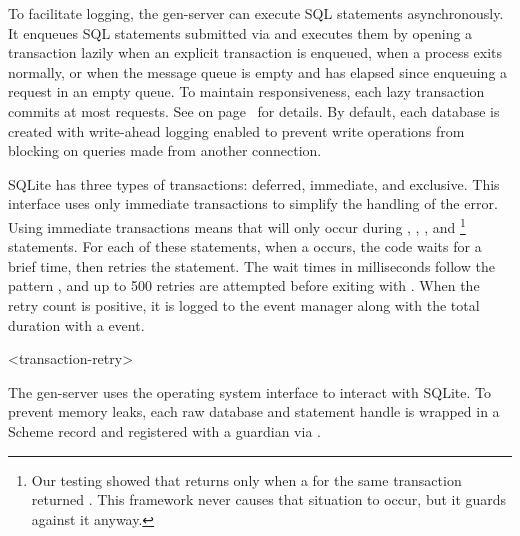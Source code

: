 To facilitate logging, the  gen-server can execute SQL statements
asynchronously. It enqueues SQL statements submitted via  and
executes them by opening a transaction lazily when an explicit transaction is
enqueued, when a  process exits normally, or when the 
message queue is empty and  has elapsed since enqueuing
a  request in an empty queue.
To maintain responsiveness, each lazy transaction commits at most   requests.
See  on page~\pageref{db:options} for details.
By default, each database is created with write-ahead logging enabled
to prevent write operations from blocking on queries made from another
connection.

SQLite has three types of transactions: deferred, immediate, and
exclusive. This interface uses only immediate transactions to simplify
the handling of the  error.  Using immediate
transactions means that  will only occur during
, , ,
and \footnote{Our testing showed that
   returns  only when a
   for the same transaction returned
  . This framework never causes that situation to
  occur, but it guards against it anyway.} statements. For each of
these statements, when a  occurs, the code waits
for a brief time, then retries the statement. The wait times in
milliseconds follow the pattern , and up to 500 retries are attempted before
exiting with .  When
the retry count is positive, it is logged to the event manager along
with the total duration with a  event.

\begin{pubevent}{<transaction-retry>}
\end{pubevent}

The  gen-server uses the operating system interface to
interact with SQLite. To prevent memory leaks, each raw database and
statement handle is wrapped in a Scheme record and registered with a
guardian via .

